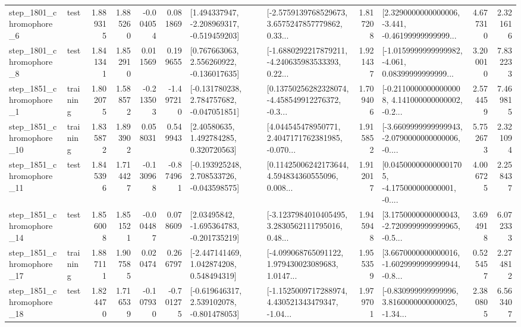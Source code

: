 \begin{tabular}{llrrrrllrlrr}
  step\_1801\_chromophore\_6 &      test &      1.889315 &    1.885260 &     -0.004054 &  0.081869 &   [1.494337947, -2.208969317, -0.519459203] &  [-2.5759139768529673, 3.6575247857779862, 0.33... &       1.817208 &  [2.3290000000000006, -3.441, -0.46199999999999... &            4.677310 &          2.321616 \\
  step\_1801\_chromophore\_8 &      test &      1.841341 &    1.852910 &      0.011569 &  0.199655 &    [0.767663063, 2.556260922, -0.136017635] &  [-1.6880292217879211, -4.240635983533393, 0.22... &       1.921437 &  [-1.0159999999999982, -4.061, 0.08399999999999... &            3.200010 &          7.832233 \\
  step\_1851\_chromophore\_1 &  training &      1.802075 &    1.588572 &     -0.213503 & -1.497210 &   [-0.131780238, 2.784757682, -0.047051851] &  [0.13750256282328074, -4.458549912276372, -0.3... &       1.709406 &  [-0.21100000000000008, 4.141000000000002, -0.2... &            2.574459 &          7.469815 \\
 step\_1851\_chromophore\_10 &  training &      1.835872 &    1.893902 &      0.058031 &  0.549943 &      [2.40580635, 1.492784285, 0.320720563] &  [4.044545478950771, 2.4047171762381985, -0.070... &       1.915852 &  [-3.6609999999999943, -2.0790000000000006, -0.... &            5.752673 &          2.321094 \\
 step\_1851\_chromophore\_11 &      test &      1.845396 &    1.714427 &     -0.130968 & -0.874961 &   [-0.193925248, 2.708533726, -0.043598575] &  [0.11425006242173644, 4.594834360555096, 0.008... &       1.912017 &  [0.045000000000001705, -4.175000000000001, -0.... &            4.006725 &          2.258437 \\
 step\_1851\_chromophore\_14 &      test &      1.856008 &    1.851521 &     -0.004487 &  0.078609 &    [2.03495842, -1.695364783, -0.201735219] &  [-3.1237984010405495, 3.2830562111795016, 0.48... &       1.945948 &  [3.1750000000000043, -2.7209999999999965, -0.5... &            3.694918 &          6.072333 \\
 step\_1851\_chromophore\_17 &  training &      1.887111 &    1.907585 &      0.020474 &  0.266797 &    [-2.447141469, 1.042874208, 0.548494319] &  [-4.099068765091122, 1.979430023089683, 1.0147... &       1.955359 &  [3.6670000000000016, -1.6029999999999944, -0.8... &            0.525457 &          2.274812 \\
 step\_1851\_chromophore\_18 &      test &      1.824470 &    1.716539 &     -0.107930 & -0.701275 &   [-0.619646317, 2.539102078, -0.801478053] &  [-1.1525009717288974, 4.430521343479347, -1.04... &       1.979701 &  [-0.830999999999996, 3.8160000000000025, -1.34... &            2.380805 &          6.563407 \\

\end{tabular}
